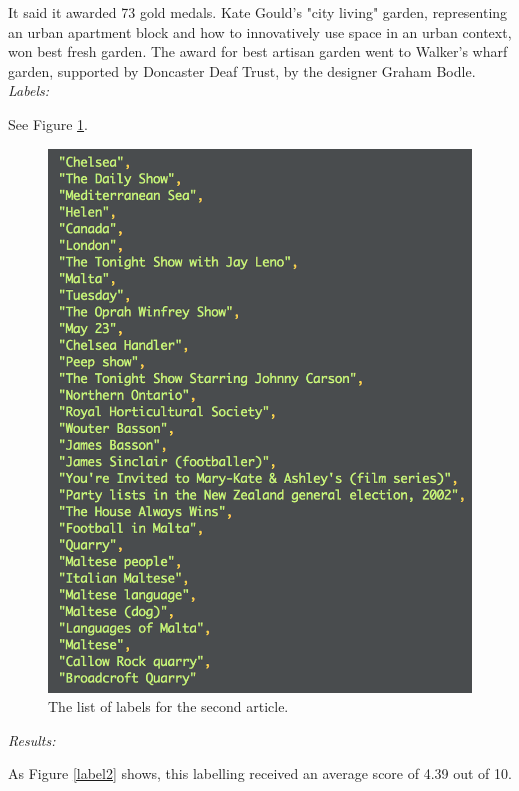 \documentclass[12pt]{article}
\begin{document}
It said it awarded 73 gold medals. Kate Gould's "city living" garden, representing an urban apartment block and how to innovatively use space in an urban context, won best fresh garden. The award for best artisan garden went to Walker's wharf garden, supported by Doncaster Deaf Trust, by the designer Graham Bodle. \\

\emph{Labels:}

See Figure \ref{labels}. \\

\begin{figure}[ht!]
  \centering
    \includegraphics[scale=0.5]{labels.png}
   \caption[A list of labels for an article in the evaluation survey]{The list of labels for the second article.}
   \label{labels}
\end{figure} 

\emph{Results:}

As Figure \ref{label2} shows, this labelling received an average score of 4.39 out of 10.
\end{document}
